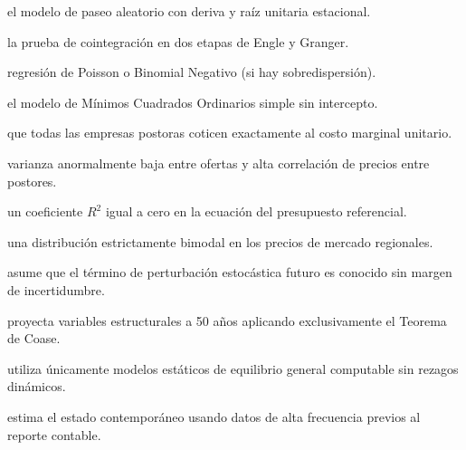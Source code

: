 \begin{opts}
    \item el modelo de paseo aleatorio con deriva y raíz unitaria estacional.
    \item la prueba de cointegración en dos etapas de Engle y Granger.
    \item regresión de Poisson o Binomial Negativo (si hay sobredispersión).
    \item el modelo de Mínimos Cuadrados Ordinarios simple sin intercepto.
\end{opts}

\begin{opts}
    \item que todas las empresas postoras coticen exactamente al costo marginal unitario.
    \item varianza anormalmente baja entre ofertas y alta correlación de precios entre postores.
    \item un coeficiente $R^2$ igual a cero en la ecuación del presupuesto referencial.
    \item una distribución estrictamente bimodal en los precios de mercado regionales.
\end{opts}

\begin{opts}
    \item asume que el término de perturbación estocástica futuro es conocido sin margen de incertidumbre.
    \item proyecta variables estructurales a 50 años aplicando exclusivamente el Teorema de Coase.
    \item utiliza únicamente modelos estáticos de equilibrio general computable sin rezagos dinámicos.
    \item estima el estado contemporáneo usando datos de alta frecuencia previos al reporte contable.
\end{opts}

